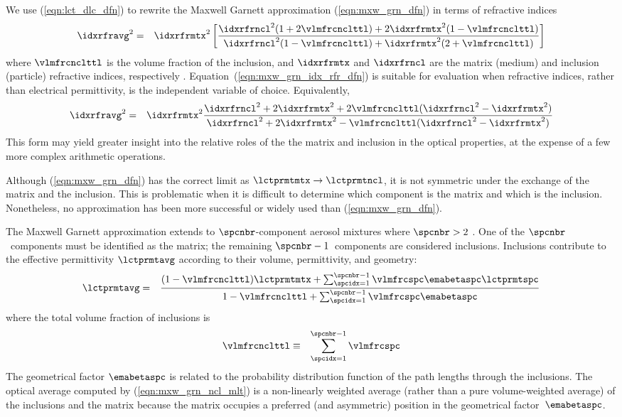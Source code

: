 \documentclass[12pt,twoside]{book}
\begin{document}
We use (\ref{eqn:lct_dlc_dfn}) to rewrite the Maxwell Garnett
approximation (\ref{eqn:mxw_grn_dfn}) in terms of refractive indices
\begin{eqnarray}
\idxrfravg^{2} & = & \idxrfrmtx^{2} \left[ 
\frac{\idxrfrncl^{2}(1+2\vlmfrcnclttl)+2\idxrfrmtx^{2}(1-\vlmfrcnclttl)}
{\idxrfrncl^{2}(1-\vlmfrcnclttl)+\idxrfrmtx^{2}(2+\vlmfrcnclttl)} \right] 
\label{eqn:mxw_grn_idx_rfr_dfn}
\end{eqnarray}
where $\vlmfrcnclttl$ is the volume fraction of the inclusion, and
$\idxrfrmtx$ and $\idxrfrncl$ are the matrix (medium) and inclusion
(particle) refractive indices, respectively \cite[]{ViC98}.  
Equation~(\ref{eqn:mxw_grn_idx_rfr_dfn}) is suitable for evaluation
when refractive indices, rather than electrical permittivity, is the  
independent variable of choice.
Equivalently,
\begin{eqnarray}
\idxrfravg^{2} & = & \idxrfrmtx^{2}
\frac{\idxrfrncl^{2}+2\idxrfrmtx^{2}+2\vlmfrcnclttl(\idxrfrncl^{2}-\idxrfrmtx^{2})}
{\idxrfrncl^{2}+2\idxrfrmtx^{2}-\vlmfrcnclttl(\idxrfrncl^{2}-\idxrfrmtx^{2})}
\label{eqn:mxw_grn_idx_rfr_dfn2}
\end{eqnarray}
This form may yield greater insight into the relative roles of the  
the matrix and inclusion in the optical properties, at the expense of 
a few more complex arithmetic operations.

Although (\ref{eqn:mxw_grn_dfn}) has the correct limit as
$\lctprmtmtx \rightarrow \lctprmtncl$, it is not symmetric under the
exchange of the matrix and the inclusion.
This is problematic when it is difficult to determine which component
is the matrix and which is the inclusion.
Nonetheless, no approximation has been more successful or widely used
than (\ref{eqn:mxw_grn_dfn}). 

The Maxwell Garnett approximation extends to $\spcnbr$-component
aerosol mixtures where $\spcnbr > 2$ \cite[][p.~216]{BoH83}.
One of the $\spcnbr$~components must be identified as the matrix;
the remaining $\spcnbr-1$~components are considered inclusions.
Inclusions contribute to the effective permittivity $\lctprmtavg$
according to their volume, permittivity, and geometry: 
\begin{eqnarray}
\lctprmtavg & = & 
\frac{(1-\vlmfrcnclttl) \lctprmtmtx + 
\sum_{\spcidx = 1}^{\spcnbr-1} \vlmfrcspc \emabetaspc \lctprmtspc}
{1-\vlmfrcnclttl+\sum_{\spcidx = 1}^{\spcnbr-1} \vlmfrcspc \emabetaspc}
\label{eqn:mxw_grn_ncl_mlt}
\end{eqnarray}
where the total volume fraction of inclusions is
\begin{eqnarray}
\vlmfrcnclttl & \equiv & \sum_{\spcidx = 1}^{\spcnbr-1} \vlmfrcspc
\label{eqn:vlm_frc_ncl_ttl_dfn}
\end{eqnarray}
The geometrical factor $\emabetaspc$ is related to the probability
distribution function of the path lengths through the inclusions. 
The optical average computed by (\ref{eqn:mxw_grn_ncl_mlt}) is 
a non-linearly weighted average (rather than a pure volume-weighted
average) of the inclusions and the matrix because the matrix occupies
a preferred (and asymmetric) position in the geometrical
factor~$\emabetaspc$. 
\end{document}
